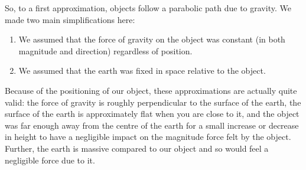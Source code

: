 \documentclass[a4paper,leqno,10pt]{article}
\theoremstyle{exercise}
\theoremstyle{plain}
\theoremstyle{definition}
\theoremstyle{remark}
\begin{document}
So, to a first approximation, objects follow a parabolic path due to gravity. We made two main simplifications here:
\begin{enumerate}
  \item We assumed that the force of gravity on the object was constant (in both magnitude and direction) regardless of position.
  \item We assumed that the earth was fixed in space relative to the object.
\end{enumerate}

Because of the positioning of our object, these approximations are actually quite valid: the force of gravity
is roughly perpendicular to the surface of the earth, the surface of the earth is approximately flat when you are close
to it, and the object was far enough away from the centre of the earth for a small increase or decrease in height
to have a negligible impact on the magnitude force felt by the object. Further, the earth is massive compared to our
object and so would feel a negligible force due to it.
\end{document}
